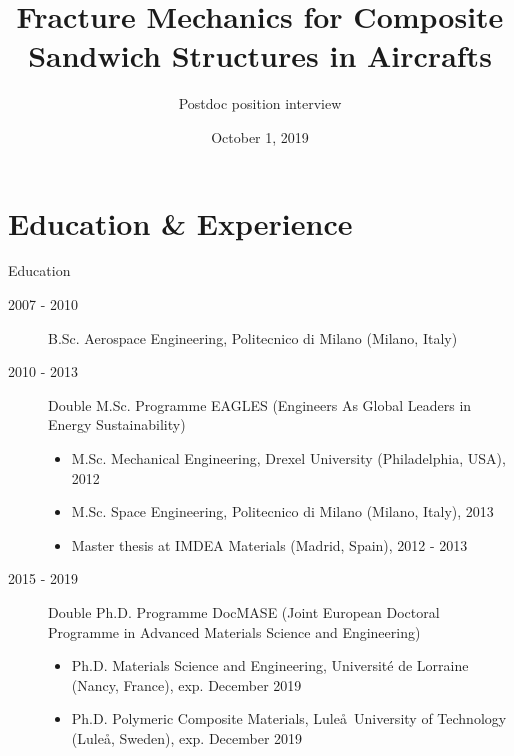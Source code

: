 \documentclass{beamer}
\title{Fracture Mechanics for Composite Sandwich Structures in Aircrafts}
\author{Postdoc position interview}
\institute{DTU}
\date{October 1, 2019}
\begin{document}
\begin{frame}
  \titlepage
\end{frame}


\section{Education \& Experience}

\begin{frame}{Education}
\small
\begin{description}
  \item[2007 - 2010] B.Sc. Aerospace Engineering, Politecnico di Milano (Milano, Italy)
  \item[2010 - 2013] Double M.Sc. Programme EAGLES (Engineers As Global Leaders in Energy Sustainability)
  \begin{itemize}
  \item M.Sc. Mechanical Engineering, Drexel University (Philadelphia, USA), 2012
  \item M.Sc. Space Engineering, Politecnico di Milano (Milano, Italy), 2013
  \item Master thesis at IMDEA Materials (Madrid, Spain), 2012 - 2013
  \end{itemize}
  \item[2015 - 2019] Double Ph.D. Programme DocMASE (Joint European Doctoral Programme in Advanced Materials Science and Engineering)
  \begin{itemize}
  \item Ph.D. Materials Science and Engineering, Universit\'e de Lorraine (Nancy, France), exp. December 2019
  \item Ph.D. Polymeric Composite Materials, Lule\aa\ University of Technology (Lule\aa, Sweden), exp. December 2019
  \end{itemize}
\end{description}
\end{frame}
\end{document}
